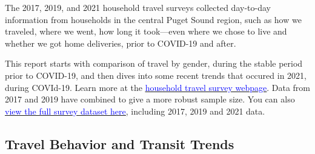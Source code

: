 \documentclass[
  12pt,
]{article}
\begin{document}
\begin{flushleft}
The 2017, 2019, and 2021 household travel surveys collected day-to-day information from households in the central Puget Sound region, such as how we traveled, where we went, how long it took—even where we chose to live and whether we got home deliveries, prior to COVID-19 and after. \smallskip


This report starts with comparison of travel by gender, during the stable period prior to COVID-19, and then dives into some recent trends that occured in 2021, during COVId-19.  Learn more at the \href{https://www.psrc.org/our-work/household-travel-survey-program}{\underline{\textcolor{blue}{household travel survey webpage}}}. Data from 2017 and 2019 have combined to give a more robust sample size.  You can also \href{https://household-travel-survey-psregcncl.hub.arcgis.com}{\underline{\textcolor{blue}{view the full survey dataset here}}}, including 2017, 2019 and 2021 data. 
\end{flushleft}

\hypertarget{travel-behavior-and-transit-trends}{%
\subsection{Travel Behavior and Transit
Trends}\label{travel-behavior-and-transit-trends}}
\end{document}
